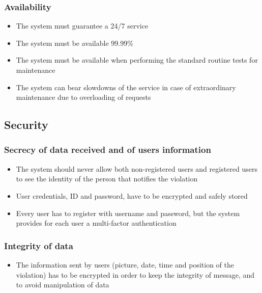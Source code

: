 \subsubsection{Availability}
\begin{itemize}
    \item The system must guarantee a 24/7 service
    \item The system must be available 99.99\%
    \item The system must be available when performing the standard routine tests for maintenance
    \item The system can bear slowdowns of the service in case of extraordinary maintenance due to overloading of requests
\end{itemize}

\subsection{Security}
\subsubsection{Secrecy of data received and of users information}
\begin{itemize}
    \item The system should never allow both non-registered users and registered users to see the identity of the person that notifies the violation
    \item User credentials, ID and password, have to be encrypted and safely stored
    \item Every user has to register with username and password, but the system provides for each user a multi-factor authentication
\end{itemize}

\subsubsection{Integrity of data}
\begin{itemize}
    \item The information sent by users (picture, date, time and position of the violation) has to be encrypted in order to keep the integrity of message, and to avoid manipulation of data
\end{itemize}

